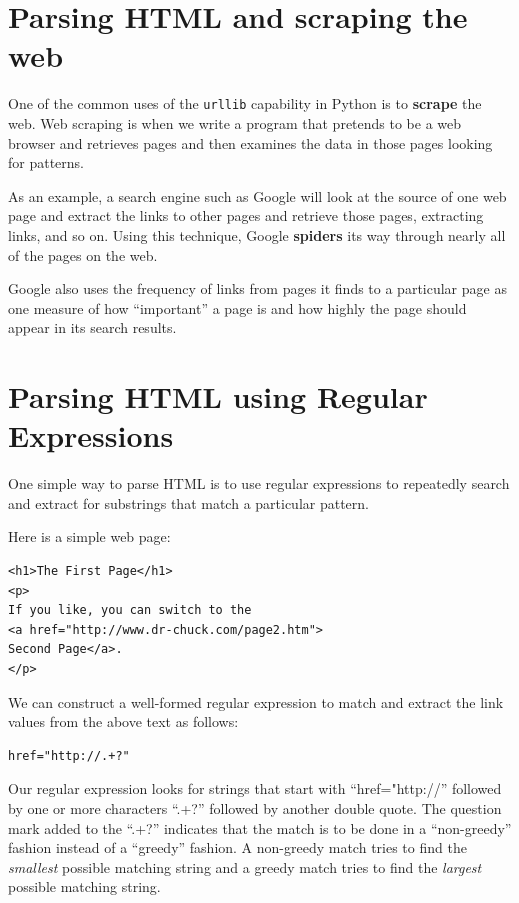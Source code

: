 \documentclass[10pt]{book}
\begin{document}
\section{Parsing HTML and scraping the web}

One of the common uses of the {\tt urllib} capability in Python is 
to {\bf scrape} the web.   Web scraping is when we write a program
that pretends to be a web browser and retrieves pages and then 
examines the data in those pages looking for patterns.

As an example, a search engine such as Google will look at the source 
of one web page and extract the links to other pages and retrieve
those pages, extracting links, and so on.   Using this technique,
Google {\bf spiders} its way through nearly all of the pages on 
the web.   

Google also uses the frequency of links from pages it finds 
to a particular page as one measure of how ``important'' 
a page is and how highly the page should appear in its search results.

\section{Parsing HTML using Regular Expressions}

One simple way to parse HTML is to use regular expressions to repeatedly
search and extract for substrings that match a particular pattern.

Here is a simple web page:

\beforeverb
\begin{verbatim}
<h1>The First Page</h1>
<p>
If you like, you can switch to the
<a href="http://www.dr-chuck.com/page2.htm">
Second Page</a>.
</p>
\end{verbatim}
\afterverb
%
We can construct a well-formed regular expression to match
and extract the link values from the above text as follows:

\beforeverb
\begin{verbatim}
href="http://.+?"
\end{verbatim}
\afterverb
%
Our regular expression looks for strings that start with
``href="http://'' followed by one or more characters
``.+?'' followed by another double quote.  The question mark 
added to the ``.+?'' indicates that the match is to be done
in a ``non-greedy'' fashion instead of a ``greedy'' fashion.  
A non-greedy match tries to find the {\em smallest} possible matching
string and a greedy match tries to find the {\em largest} possible
matching string.
\end{document}
